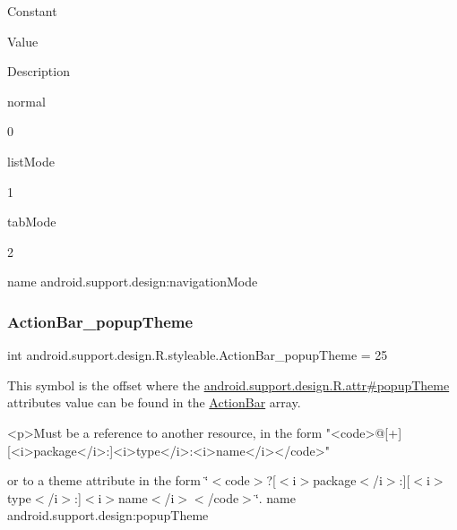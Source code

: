 Constant

Value

Description 

{\ttfamily normal}

0

{\ttfamily list\+Mode}

1

{\ttfamily tab\+Mode}

2

name android.\+support.\+design\+:navigation\+Mode \mbox{\label{classandroid_1_1support_1_1design_1_1R_1_1styleable_ad9bc331aad9e2db0b8aae27b3c65b27a}} 
\subsubsection{\texorpdfstring{Action\+Bar\+\_\+popup\+Theme}{ActionBar\_popupTheme}}
{\footnotesize\ttfamily int android.\+support.\+design.\+R.\+styleable.\+Action\+Bar\+\_\+popup\+Theme = 25\hspace{0.3cm}{\ttfamily [static]}}

This symbol is the offset where the \hyperlink{classandroid_1_1support_1_1design_1_1R_1_1attr_a31e4e569ed674c1af7374b723ea84669}{android.\+support.\+design.\+R.\+attr\#popup\+Theme} attribute\textquotesingle{}s value can be found in the \hyperlink{classandroid_1_1support_1_1design_1_1R_1_1styleable_ab795220a96557d11f8c21359b95bed82}{Action\+Bar} array.

\begin{DoxyVerb}      <p>Must be a reference to another resource, in the form "<code>@[+][<i>package</i>:]<i>type</i>:<i>name</i></code>"
\end{DoxyVerb}
 or to a theme attribute in the form \char`\"{}$<$code$>$?\mbox{[}$<$i$>$package$<$/i$>$\+:\mbox{]}\mbox{[}$<$i$>$type$<$/i$>$\+:\mbox{]}$<$i$>$name$<$/i$>$$<$/code$>$\char`\"{}.  name android.\+support.\+design\+:popup\+Theme \mbox{\label{classandroid_1_1support_1_1design_1_1R_1_1styleable_a6016ed7a959c61f6ddc620a7a7b8c41f}} 
